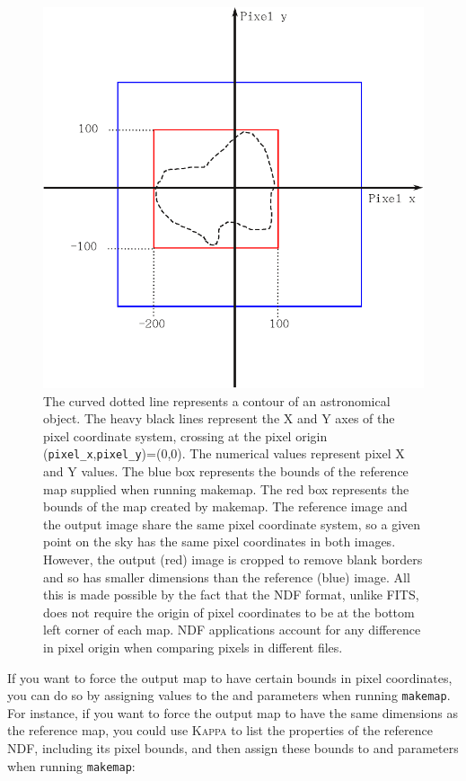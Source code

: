 \begin{terminalv}
\begin{figure}
\begin{center}
  \includegraphics[width=0.8\linewidth]{sc21_pixelco}
\end{center}
\caption[Pixel coordinates]{\small The curved dotted line represents a
contour of an astronomical object. The heavy black lines represent the
X and Y axes of the pixel coordinate system, crossing at the pixel origin
(\texttt{pixel\_x},\texttt{pixel\_y})=(0,0). The numerical values
represent pixel X and Y values. The blue box represents the
bounds of the reference map supplied when running makemap. The
red box represents the bounds of the map created by makemap.
The reference image and the output image share the same pixel
coordinate system, so a given point on the sky has the same pixel
coordinates in both images. However, the output (red) image is cropped to
remove blank borders and so has smaller dimensions than the reference
(blue) image. All this is made possible by the fact that the NDF format, unlike
FITS, does not require the origin of pixel coordinates to be at the
bottom left corner of each map. NDF applications account for any
difference in pixel origin when comparing pixels in different files.}
 \label{fig:pixelco}
\end{figure}

If you want to force the output map to have certain bounds in pixel
coordinates, you can do so by assigning values to the  and
 parameters when running \texttt{makemap}. For instance, if
you want to force the output map to have the same dimensions as the
reference map, you could use \textsc{Kappa} 
to list the properties of the reference NDF, including its pixel bounds, and
then assign these bounds to  and  parameters when
running \texttt{makemap}:


\end{terminalv}
